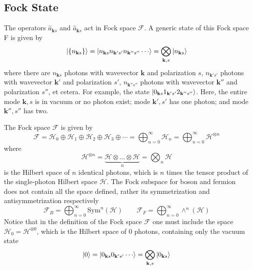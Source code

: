\documentclass[../../../main.tex]{subfiles}
\begin{document}
\subsection{Fock State}
The operators $\hat{a}_{\mathbf{k }s }$ and $\hat{a }_{\mathbf{k }s}$ act in Fock space $\mathcal{F}$.
A generic state of this Fock space F is given by
\begin{equation*}
  \ket{\left\{ n_{\mathbf{k }s} \right\} }
  = \ket{n_{\mathbf{k} s}n_{\mathbf{k}'s'}n_{\mathbf{k}''s''} \cdots }
  =\bigotimes_{\mathbf{k },s} \ket{n_{\mathbf{k }s}}
\end{equation*}
where there are \( n_{\mathbf{k} s} \) photons with wavevector \( \mathbf{k} \) and polarization \( s \), \( n_{\mathbf{k}'s'} \) photons with wavevector \( \mathbf{k}' \) and polarization \( s' \), \( n_{\mathbf{k}''s''} \) photons with wavevector \( \mathbf{k}'' \) and polarization \( s'' \), et cetera.
For example, the state $\ket{ 0_{\mathbf{k} s} 1_{\mathbf{k}'s'}  2_{\mathbf{k}''s''}}$.
Here, the entire mode $\mathbf{k},s$ is in vacuum or no photon exist; mode $\mathbf{k'},s'$ has one photon; and mode $\mathbf{k}'',s''$ has two.

The Fock space \( \mathcal{F} \) is given by
\begin{equation*}
  \mathcal{F} = \mathcal{H}_0 \oplus \mathcal{H}_1 \oplus \mathcal{H}_2 \oplus \mathcal{H}_3 \oplus \cdots = \bigoplus_{n=0}^{\infty} \mathcal{H}_n = \bigoplus_{n=0}^{\infty} \mathcal{H}^{\otimes n}
\end{equation*}
where 
\begin{equation*}
\mathcal{H}^{\otimes n}  =
\underbrace{\mathcal{H} \otimes \dots \otimes \mathcal{H}}_n = 
\bigotimes_n \mathcal{H}
\end{equation*}
is the Hilbert space of $n$ identical photons, which is $n$ times the tensor product of the single-photon Hilbert space $\mathcal{H}$.
The Fock subspace for boson and fermion does not contain all the space defined, rather its symmetrization and antisymmetrization respectively
\begin{equation*}
  \mathcal{F}_B = \bigoplus_{n=0}^{\infty} \mathrm{Sym}^n(\mathcal{H}) \qquad 
  \mathcal{F}_F = \bigoplus_{n=0}^{\infty} \wedge^n(\mathcal{H})
\end{equation*}
Notice that in the definition of the Fock space $\mathcal{F}$ one must include the space $\mathcal{H}_0 = \mathcal{H}^{\otimes 0}$, which is the Hilbert space of 0 photons, containing only the vacuum state
\begin{equation*}
  \ket{0}
  = \ket{0_{\mathbf{k} s}0_{\mathbf{k}'s'}\cdots }
  =\bigotimes_{\mathbf{k },s} \ket{0_{\mathbf{k }s}}
\end{equation*}
\end{document}
